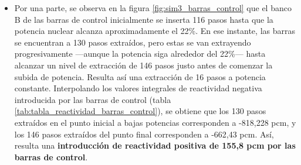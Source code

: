 \begin{itemize}
  \item Por una parte, se observa en la figura \ref{fig:sim3_barras_control} que el banco B de las barras de control inicialmente se inserta 116 pasos hasta que la potencia nuclear alcanza aproximadamente el 22\%. En ese instante, las barras se encuentran a 130 pasos extraídos, pero estas se van extrayendo progresivamente ---aunque la potencia siga alrededor del 22\%--- hasta alcanzar un nivel de extracción de 146 pasos justo antes de comenzar la subida de potencia. Resulta así una extracción de 16 pasos a potencia constante. Interpolando los valores integrales de reactividad negativa introducida por las barras de control (tabla \ref{tab:tabla_reactividad_barras_control}), se obtiene que los 130 pasos extraídos en el punto inicial a bajas potencias corresponden a -818,228 pcm, y los 146 pasos extraídos del punto final corresponden a -662,43 pcm. Así, resulta una \textbf{introducción de reactividad positiva de 155,8 pcm por las barras de control}.
  
  \begin{table}[]
    \centering
    \vspace{-0.4cm}
    \caption{Tabla recortada de los valores integrales de reactividad negativa introducida en función de los pasos extraídos de los bancos A y B con solape de la Central Nuclear de Zorita, \acrshort{bol}, HFP y EqXe (\cite{enusa_1998}).}
    \label{tab:tabla_reactividad_barras_control}
    \end{table}
  

\end{itemize}
